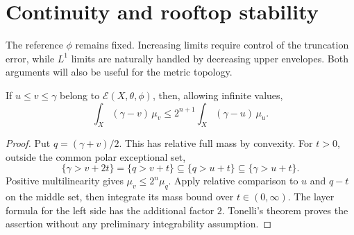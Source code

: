 \section{Continuity and rooftop stability}
\label{sec:relative-energy-stability}
The reference $\phi$ remains fixed. Increasing limits require control of the truncation error, while $L^1$ limits are naturally handled by decreasing upper envelopes. Both arguments will also be useful for the metric topology.

\begin{lemma}\label{lem:ordered-relative-self-integral-estimate}
If $u\leq v\leq\gamma$ belong to $\mathcal E(X,\theta,\phi)$, then, allowing infinite values,
\[
 \int_X(\gamma-v)\,\mu_v
                 \leq2^{n+1}\int_X(\gamma-u)\,\mu_u.
\]
\end{lemma}
\begin{proof}
Put $q=(\gamma+v)/2$. This has relative full mass by convexity. For $t>0$, outside the common polar exceptional set,
\[
 \{\gamma>v+2t\}=\{q>v+t\}
       \subseteq\{q>u+t\}\subseteq\{\gamma>u+t\}.
\]
Positive multilinearity gives $\mu_v\leq2^n\mu_q$. Apply relative comparison to $u$ and $q-t$ on the middle set, then integrate its mass bound over $t\in(0,\infty)$. The layer formula for the left side has the additional factor $2$. Tonelli's theorem proves the assertion without any preliminary integrability assumption.
\end{proof}

